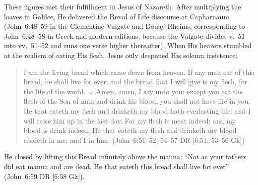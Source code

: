 These figures met their fulfillment in Jesus of Nazareth. After multiplying the loaves in Galilee, He delivered the Bread of Life discourse at Capharnaum (John~6:48--59 in the Clementine Vulgate and Douay-Rheims, corresponding to John~6:48--58 in Greek and modern editions, because the Vulgate divides v.~51 into vv.~51--52 and runs one verse higher thereafter). When His hearers stumbled at the realism of eating His flesh, Jesus only deepened His solemn insistence:
\begin{quotation}
I am the living bread which came down from heaven. If any man eat of this bread, he shall live for ever: and the bread that I will give is my flesh, for the life of the world. \dots\ Amen, amen, I say unto you: except you eat the flesh of the Son of man and drink his blood, you shall not have life in you. He that eateth my flesh and drinketh my blood hath everlasting life: and I will raise him up in the last day. For my flesh is meat indeed: and my blood is drink indeed. He that eateth my flesh and drinketh my blood abideth in me: and I in him. (John~6:51--52, 54--57 DR [6:51, 53--56 Gk])
\end{quotation}
He closed by lifting this Bread infinitely above the manna: ``Not as your fathers did eat manna and are dead. He that eateth this bread shall live for ever'' (John~6:59 DR [6:58 Gk]).

